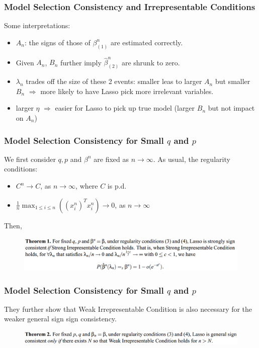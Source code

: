\documentclass{beamer}
\begin{document}
	\begin{frame}
		\frametitle{Model Selection Consistency and Irrepresentable Conditions}
		Some interpretations:
		\begin{itemize}
			\item 
			$A_n$: the signs of those of $\beta_{(1)}^n$ are estimated correctly.
			\item
			Given $A_n$, $B_n$ further imply $\hat{\beta}^n_{(2)}$ are shrunk to zero.
			\item
			$\lambda_n$ trades off the size of these 2 events: smaller leas to larger $A_n$ but smaller $B_n$ $\Rightarrow$ more likely to have Lasso pick more irrelevant variables.
			\item
			larger $\eta$  $\Rightarrow$ easier for Lasso to pick up true model (larger $B_n$ but not impact on $A_n$)
		\end{itemize}
	\end{frame}
	
	\begin{frame}
		\frametitle{Model Selection Consistency for Small $q$ and $p$}
		We first consider $q, p$ and $\beta^n$ are fixed as $n\to \infty$. As usual, the regularity conditions:
		\begin{itemize}
			\item 
			$C^n\to C$, as $n\to \infty$, where $C$ is p.d.
			\item
			$\frac{1}{n}\max_{1\leq i\leq n}((x_i^n)^Tx_i^n) \to 0$, as $n \to \infty$
		\end{itemize}
		Then,
		\begin{figure}
			\includegraphics[width=1\linewidth]{image006.png}
		\end{figure}
	\end{frame}
	
	\begin{frame}
		\frametitle{Model Selection Consistency for Small $q$ and $p$}
		They further show that Weak Irrepresentable Condition is also necessary for the weaker general sign sign consistency.
		\begin{figure}
			\includegraphics[width=1\linewidth]{image007.png}
		\end{figure}
	\end{frame}
	
\end{document}
